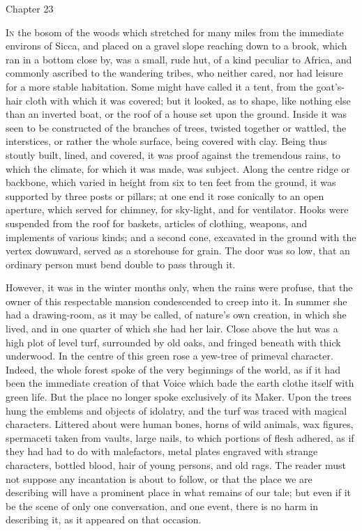 Chapter 23


I\textsc{n} the bosom of the woods which stretched for many miles from
the immediate environs of Sicca, and placed on a gravel slope reaching
down to a brook, which ran in a bottom close by, was a small, rude
hut, of a kind peculiar to Africa, and commonly ascribed to the
wandering tribes, who neither cared, nor had leisure for a more stable
habitation. Some might have called it a tent, from the goat's-hair
cloth with which it was covered; but it looked, as to shape, like
nothing else than an inverted boat, or the roof of a house set upon
the ground. Inside it was seen to be constructed of the branches of
trees, twisted together or wattled, the interstices, or rather the
whole surface, being covered with clay. Being thus stoutly built,
lined, and covered, it was proof against the tremendous rains, to
which the climate, for which it was made, was subject. Along the
centre ridge or backbone, which varied in height from six to ten feet
from the ground, it was supported by three posts or pillars; at one
end it rose conically to an open aperture, which served for chimney,
for sky-light, and for ventilator. Hooks were suspended from the roof
for baskets, articles of clothing, weapons, and implements of
various kinds; and a second cone, excavated in the ground with the
vertex downward, served as a storehouse for grain. The door was so
low, that an ordinary person must bend double to pass through it.

However, it was in the winter months only, when the rains were
profuse, that the owner of this respectable mansion condescended to
creep into it. In summer she had a drawing-room, as it may be called,
of nature's own creation, in which she lived, and in one quarter of
which she had her lair. Close above the hut was a high plot of level
turf, surrounded by old oaks, and fringed beneath with thick underwood.
In the centre of this green rose a yew-tree of primeval character.
Indeed, the whole forest spoke of the very beginnings of the world, as
if it had been the immediate creation of that Voice which bade the
earth clothe itself with green life. But the place no longer spoke
exclusively of its Maker. Upon the trees hung the emblems and objects
of idolatry, and the turf was traced with magical characters. Littered
about were human bones, horns of wild animals, wax figures, spermaceti
taken from vaults, large nails, to which portions of flesh adhered, as
if they had had to do with malefactors, metal plates engraved with
strange characters, bottled blood, hair of young persons, and old
rags. The reader must not suppose any incantation is about to follow,
or that the place we are describing will have a prominent place in
what remains of our tale; but even if it be the scene of only one conversation, and one event, there is no harm in describing it, as
it appeared on that occasion.

